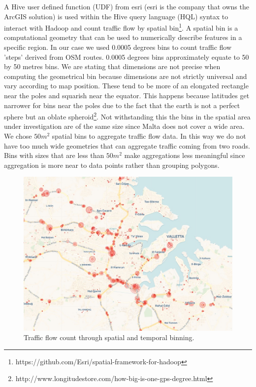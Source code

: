 \documentclass[12pt, a4paper]{report}
\theoremstyle{definition}
\theoremstyle{definition}%
\theoremstyle{definition}%
\theoremstyle{definition}%
\theoremstyle{definition}%
\theoremstyle{definition}%
\begin{document}
A Hive user defined function (UDF) from esri (esri is the company that owns the ArcGIS solution) is used within the Hive query language (HQL) syntax to interact with Hadoop and count traffic flow by spatial bin\footnote{https://github.com/Esri/spatial-framework-for-hadoop}. A spatial bin is a computational geometry that can be used to numerically describe features in a specific region. In our case we used 0.0005 degrees bins to count traffic flow 'steps' derived from OSM routes. 0.0005 degrees bins approximately equate to 50 by 50 metres bins. We are stating that dimensions are not precise when computing the geometrical bin because dimensions are not strictly universal and vary according to map position. These tend to be more of an elongated rectangle near the poles and squarish near the equator. This happens because latitudes get narrower for bins near the poles due to the fact that the earth is not a perfect sphere but an oblate spheroid\footnote{http://www.longitudestore.com/how-big-is-one-gps-degree.html}. Not withstanding this the bins in the spatial area under investigation are of the same size since Malta does not cover a wide area. We chose $50m^2$ spatial bins to aggregate traffic flow data. In this way we do not have too much wide geometries that can aggregate traffic coming from two roads. Bins with sizes that are less than $50m^2$ make aggregations less meaningful since aggregation is more near to data points rather than grouping polygons. 

\begin{figure}[!]	
	\includegraphics[scale=0.6]{concentric_map.jpg}
	\centering
	\caption{Traffic flow count through spatial and temporal binning. }
	\label{fig:spatial_binning_traffic_count}
\end{figure}
\end{document}
